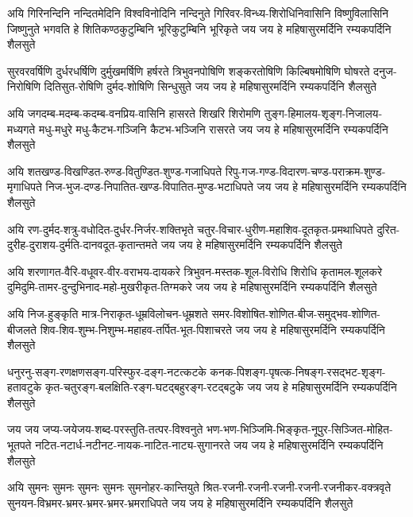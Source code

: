 
\setlength{\shlokaspaceskip}{10pt}
\fourlineindentedshloka
{अयि गिरिनन्दिनि नन्दितमेदिनि विश्वविनोदिनि नन्दिनुते}
{गिरिवर-विन्ध्य-शिरोधिनिवासिनि विष्णुविलासिनि जिष्णुनुते}
{भगवति हे शितिकण्ठकुटुम्बिनि भूरिकुटुम्बिनि भूरिकृते}
{जय जय हे महिषासुरमर्दिनि रम्यकपर्दिनि शैलसुते}

\fourlineindentedshloka
{सुरवरवर्षिणि दुर्धरधर्षिणि दुर्मुखमर्षिणि हर्षरते}
{त्रिभुवनपोषिणि शङ्करतोषिणि किल्बिषमोषिणि घोषरते}
{दनुज-निरोषिणि दितिसुत-रोषिणि दुर्मद-शोषिणि सिन्धुसुते}
{जय जय हे महिषासुरमर्दिनि रम्यकपर्दिनि शैलसुते}

\fourlineindentedshloka
{अयि जगदम्ब-मदम्ब-कदम्ब-वनप्रिय-वासिनि हासरते}
{शिखरि शिरोमणि तुङ्ग-हिमालय-शृङ्ग-निजालय-मध्यगते}
{मधु-मधुरे मधु-कैटभ-गञ्जिनि कैटभ-भञ्जिनि रासरते}
{जय जय हे महिषासुरमर्दिनि रम्यकपर्दिनि शैलसुते}

\fourlineindentedshloka
{अयि शतखण्ड-विखण्डित-रुण्ड-वितुण्डित-शुण्ड-गजाधिपते}
{रिपु-गज-गण्ड-विदारण-चण्ड-पराक्रम-शुण्ड-मृगाधिपते}
{निज-भुज-दण्ड-निपातित-खण्ड-विपातित-मुण्ड-भटाधिपते}
{जय जय हे महिषासुरमर्दिनि रम्यकपर्दिनि शैलसुते}

\fourlineindentedshloka
{अयि रण-दुर्मद-शत्रु-वधोदित-दुर्धर-निर्जर-शक्तिभृते}
{चतुर-विचार-धुरीण-महाशिव-दूतकृत-प्रमथाधिपते}
{दुरित-दुरीह-दुराशय-दुर्मति-दानवदूत-कृतान्तमते}
{जय जय हे महिषासुरमर्दिनि रम्यकपर्दिनि शैलसुते}

\fourlineindentedshloka
{अयि शरणागत-वैरि-वधूवर-वीर-वराभय-दायकरे}
{त्रिभुवन-मस्तक-शूल-विरोधि शिरोधि कृतामल-शूलकरे}
{दुमिदुमि-तामर-दुन्दुभिनाद-महो-मुखरीकृत-तिग्मकरे}
{जय जय हे महिषासुरमर्दिनि रम्यकपर्दिनि शैलसुते}

\fourlineindentedshloka
{अयि निज-हुङ्कृति मात्र-निराकृत-धूम्रविलोचन-धूम्रशते}
{समर-विशोषित-शोणित-बीज-समुद्भव-शोणित-बीजलते}
{शिव-शिव-शुम्भ-निशुम्भ-महाहव-तर्पित-भूत-पिशाचरते}
{जय जय हे महिषासुरमर्दिनि रम्यकपर्दिनि शैलसुते}

\fourlineindentedshloka
{धनुरनु-सङ्ग-रणक्षणसङ्ग-परिस्फुर-दङ्ग-नटत्कटके}
{कनक-पिशङ्ग-पृषत्क-निषङ्ग-रसद्भट-शृङ्ग-हतावटुके}
{कृत-चतुरङ्ग-बलक्षिति-रङ्ग-घटद्बहुरङ्ग-रटद्बटुके}
{जय जय हे महिषासुरमर्दिनि रम्यकपर्दिनि शैलसुते}

\fourlineindentedshloka
{जय जय जप्य-जयेजय-शब्द-परस्तुति-तत्पर-विश्वनुते}
{भण-भण-भिञ्जिमि-भिङ्कृत-नूपुर-सिञ्जित-मोहित-भूतपते}
{नटित-नटार्ध-नटीनट-नायक-नाटित-नाट्य-सुगानरते}
{जय जय हे महिषासुरमर्दिनि रम्यकपर्दिनि शैलसुते}

\fourlineindentedshloka
{अयि सुमनः सुमनः सुमनः सुमनः सुमनोहर-कान्तियुते}
{श्रित-रजनी-रजनी-रजनी-रजनी-रजनीकर-वक्त्रवृते}
{सुनयन-विभ्रमर-भ्रमर-भ्रमर-भ्रमर-भ्रमराधिपते}
{जय जय हे महिषासुरमर्दिनि रम्यकपर्दिनि शैलसुते}

